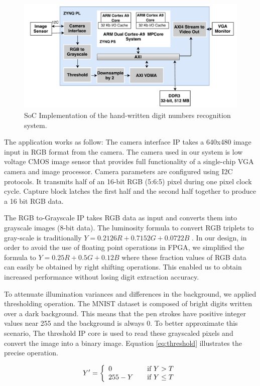 \documentclass[sigconf]{acmart}
\theoremstyle{plain}
\theoremstyle{remark}
\begin{document}
\begin{figure} 
\centering
\includegraphics[width=1\linewidth]{FPLDiagram.pdf}
\caption{SoC Implementation of the hand-written digit numbers recognition system.}
\label{fig:proposedArchitecture}
\end{figure}

The application works as follow: The camera interface IP takes a 640x480 image input in RGB format from the camera. The camera used in our system is low voltage CMOS image sensor that provides full functionality of a single-chip VGA camera and image processor. Camera parameters are configured using I2C protocols. It transmits half of an 16-bit RGB (5:6:5) pixel during one pixel clock cycle. Capture block latches the first half and the second half together to produce a 16 bit RGB data. 

The RGB to-Grayscale IP takes RGB data as input and converts them into grayscale images (8-bit data). The luminosity formula to convert RGB triplets to gray-scale is traditionally $Y=0.2126R+0.7152G+0.0722B$ . In our design, in order to avoid the use of floating point operations in FPGA, we simplified the formula to $Y=0.25R+0.5G+0.12B$  where these fraction values of RGB data can easily be obtained by right shifting operations. This enabled us to obtain increased performance without losing digit extraction accuracy.

To attenuate illumination variances and differences in the background, we applied thresholding operation. The MNIST dataset is composed of bright digits written over a dark background. This means that the pen strokes have positive integer values near 255 and the background is always 0. To better approximate this scenario, The threshold IP core is used to read these grayscaled pixels and convert the image into a binary image. Equation \ref{eq:threshold} illustrates the precise operation.


\begin{equation} \label{eq:threshold}
Y' = \left\{ 
  \begin{array}{l l}
    0 & \quad \text{if $Y>T$}\\
   255-Y & \quad \text{if $Y\leq T$}
  \end{array} \right.
\end{equation} 
\end{document}
